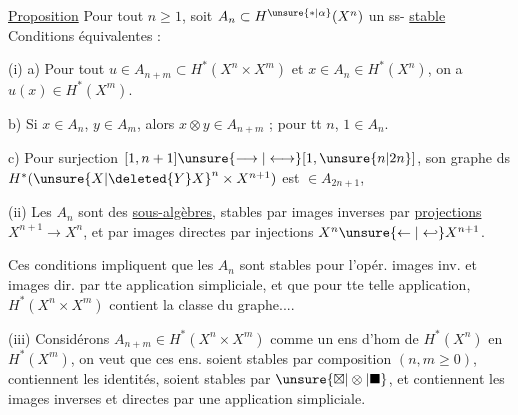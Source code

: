 \uline{Proposition} Pour tout $n\geq1$, soit $A_n\subset H^{\unsure{*|\alpha}}(X^n)$ un ss- \uline{stable} 
Conditions équivalentes :

(i) a) Pour tout  $u\in A_{n+m}\subset H^*(X^n\times X^m)$ et $x\in A_n\in H^*(X^n)$, on a $u(x)\in H^*(X^m)$.

b) Si $x\in A_n$, $y\in A_m$, alors $x\otimes y\in A_{n+m}$ ; pour tt $n$, $1\in A_n$.

c) Pour   surjection $[1,n+1]\unsure{\longrightarrow|\longleftrightarrow}[1,\unsure{n|2n}]$, son graphe ds $H^*(\unsure{X|\deleted{Y}X}^n\times X^{n+1})$ est $\in A_{2n+1}$, 

(ii) Les  $A_n$ sont des \uline{sous-algèbres}, stables par images inverses  par \uline{projections} $X^{n+1}\longrightarrow X^n$, et  par images directes par injections $X^n\unsure{\leftarrow|\hookleftarrow}X^{n+1}$.

Ces conditions impliquent que les $A_n$ sont stables pour l'opér. images inv. et images dir. par tte application simpliciale,  et que  pour tte telle application, $H^*(X^n\times X^m)$ contient la classe du graphe....

(iii) Considérons $A_{n+m}\in H^*(X^n\times X^m)$ comme un ens d'hom de $H^*(X^n)$ en $H^*(X^m)$, on veut que ces ens. soient stables par composition $(n,m\geq0)$, contiennent les identités, soient stables par $\unsure{\boxtimes|\otimes|\blacksquare}$, et contiennent les  images inverses et directes par une application simpliciale.

